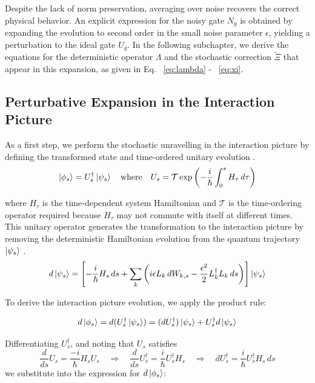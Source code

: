 \documentclass[9pt,a4paper,twocolumn,twoside]{tau-class/tau}
\begin{document}
Despite the lack of norm preservation, averaging over noise recovers the correct physical behavior. An explicit expression for the noisy gate $N_g$ is obtained by expanding the evolution to second order in the small noise parameter $\epsilon$, yielding a perturbation to the ideal gate $U_g$. In the following subchapter, we derive the equations for the deterministic operator $\Lambda$ and the stochastic correction $\tilde{\Xi}$ that appear in this expansion, as given in Eq. ~\eqref{eq:lambda} - ~\eqref{eq:xi}.
 \newpage
\subsection{Perturbative Expansion in the Interaction Picture}
As a first step, we perform the stochastic unravelling in the interaction picture by defining the transformed state and time-ordered unitary evolution \cite{dibartolomeo2023noisy}.
\begin{equation}
    \ket{\phi_s} = U_s^\dagger \ket{\psi_s} \quad \text{where} \quad U_s = \mathcal{T} \exp\left( -\frac{i}{\hbar} \int_0^s H_\tau \, d\tau \right)
    \label{eq: transformed state in interaction picture}
\end{equation}

where \( H_\tau \) is the time-dependent system Hamiltonian and \(\mathcal{T}\) is the time-ordering operator required because \(H_{\tau}\) may not commute with itself at different times. This unitary operator generates the transformation to the interaction picture by removing the deterministic Hamiltonian evolution from the quantum trajectory \( \ket{\psi_s} \) \cite{dibartolomeo2023noisy}.
\begin{equation}
d \ket{\psi_s} = \left[ -\frac{i}{\hbar} H_s \, ds + \sum_k \left( i \epsilon L_k \, dW_{k,s} - \frac{\epsilon^2}{2} L_k^\dagger L_k \, ds \right) \right] \ket{\psi_s}
\label{eq: schrodinger_sde}
\end{equation}

To derive the interaction picture evolution, we apply the product rule:

\begin{equation}
    d\ket{\phi_s} = d(U_s^\dagger \ket{\psi_s}) = (dU_s^\dagger)\ket{\psi_s} + U_s^\dagger d\ket{\psi_s}
    \label{eq: d phi}
\end{equation}

Differentiating \( U_s^\dagger \), and noting that \( U_s \) satisfies
\begin{equation}
    \frac{d}{ds} U_s = \frac{-i}{\hbar} H_s U_s \quad \Rightarrow \quad \frac{d}{ds} U_s^\dagger = \frac{i}{\hbar} U_s^\dagger H_s \quad \Rightarrow \quad 
    dU_s^\dagger = \frac{i}{\hbar} U_s^\dagger H_s \, ds
    \label{eq: d U_s}
\end{equation}
we substitute into the expression for \( d\ket{\phi_s} \): 
\end{document}
